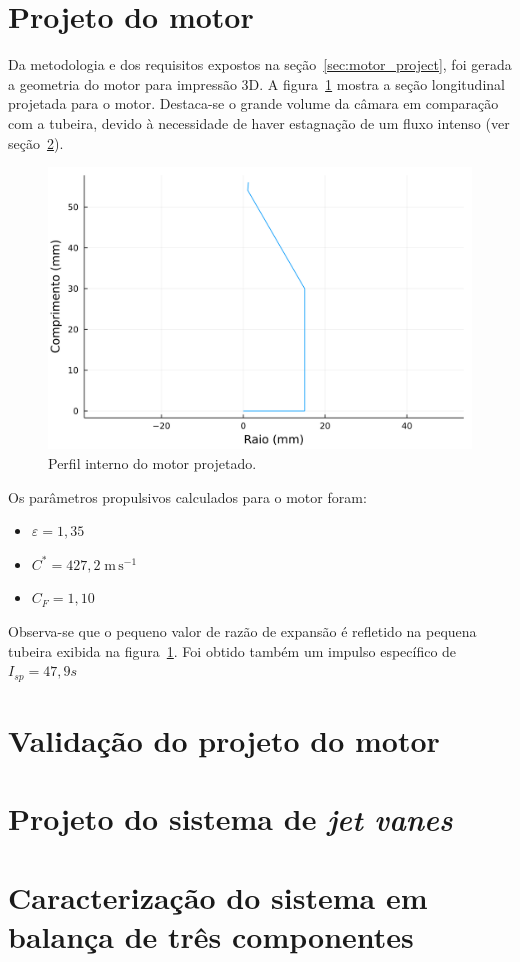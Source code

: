 
\section{Projeto do motor}

Da metodologia e dos requisitos expostos na seção~\ref{sec:motor_project}, foi gerada a geometria do motor para impressão 3D. A figura~\ref{fig:internal_profile} mostra a seção longitudinal projetada para o motor. Destaca-se o grande volume da câmara em comparação com a tubeira, devido à necessidade de haver estagnação de um fluxo intenso (ver seção~\ref{sec:result_validation}).

\begin{figure}[htbp]
    \centering
    \includegraphics[width=\textwidth]{img/internal_profile.png}
    \caption{Perfil interno do motor projetado.}\label{fig:internal_profile}
\end{figure}

Os parâmetros propulsivos calculados para o motor foram:
\begin{itemize}
    \item \( \varepsilon = 1,35 \)
    \item \(C^* = 427,2\;\mathrm{m}\,\mathrm{s}^{-1}\)
    \item \(C_{F} = 1,10\)
\end{itemize}

Observa-se que o pequeno valor de razão de expansão é refletido na pequena tubeira exibida na figura~\ref{fig:internal_profile}. Foi obtido também um impulso específico de \(I_{sp} = 47,9s\)

\section{Validação do projeto do motor}\label{sec:result_validation}

\section{Projeto do sistema de \textit{jet vanes}}

\section{Caracterização do sistema em balança de três componentes}